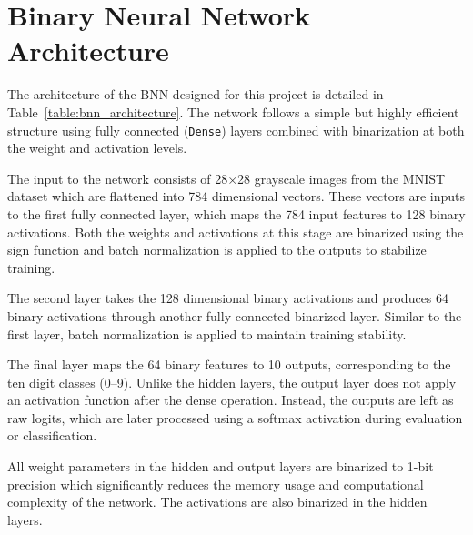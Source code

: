 \documentclass[a4paper,12pt]{report}
\begin{document}
\section{Binary Neural Network Architecture}
The architecture of the BNN designed for this project is detailed in Table~\ref{table:bnn_architecture}. The network follows a simple but highly efficient structure using fully connected (\texttt{Dense}) layers combined with binarization at both the weight and activation levels.

The input to the network consists of 28$\times$28 grayscale images from the MNIST dataset which are flattened into 784 dimensional vectors. These vectors are inputs to the first fully connected layer, which maps the 784 input features to 128 binary activations. Both the weights and activations at this stage are binarized using the sign function and batch normalization is applied to the outputs to stabilize training.

The second layer takes the 128 dimensional binary activations and produces 64 binary activations through another fully connected binarized layer. Similar to the first layer, batch normalization is applied to maintain training stability.

The final layer maps the 64 binary features to 10 outputs, corresponding to the ten digit classes (0–9). Unlike the hidden layers, the output layer does not apply an activation function after the dense operation. Instead, the outputs are left as raw logits, which are later processed using a softmax activation during evaluation or classification.

All weight parameters in the hidden and output layers are binarized to 1-bit precision which significantly reduces the memory usage and computational complexity of the network. The activations are also binarized in the hidden layers.
\begin{table}[htbp]
    \centering
    \vspace{0.5\baselineskip}
    \caption{Detailed Architecture of the Binary Neural Network Used in This Project}
    \label{table:bnn_architecture}
\end{table}
\end{document}
